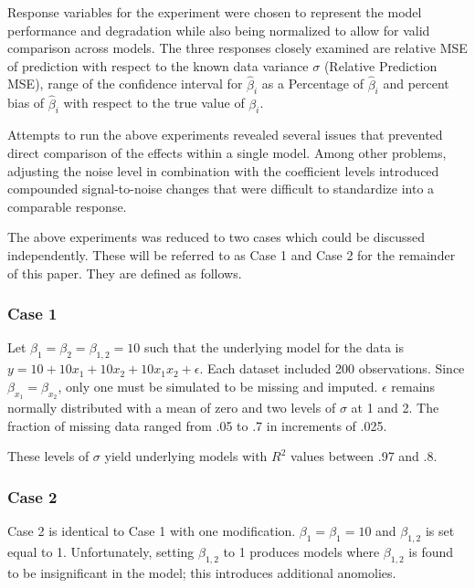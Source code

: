 \documentclass[../../paper.tex]{subfiles}
\begin{document}
Response variables for the experiment were chosen to represent the model performance
and degradation while also being normalized to allow for valid comparison across
models. The three responses closely examined are relative MSE of prediction
with respect to the known data variance $\sigma$ (Relative Prediction MSE), range of the confidence interval for $\hat{\beta}_{i}$ as a Percentage of $\hat{\beta}_{i}$
and percent bias of $\hat{\beta}_{i}$ with respect to the true value of $\beta_{i}$.

Attempts to run the above experiments revealed several issues that prevented direct comparison of the effects within a single model. Among other problems, adjusting the noise level in combination with the coefficient levels introduced compounded signal-to-noise changes that were difficult to standardize into a comparable response.

The above experiments was reduced to two cases which could be discussed independently.
These will be referred to as Case 1 and Case 2 for the remainder of this paper.
They are defined as follows.

\subsubsection{Case 1}
Let $\beta_{ 1} = \beta_{2} = \beta_{1,2} = 10$ such that the underlying model for the data is $y = 10 + 10x_{1} + 10x_{2} + 10x_{1}x_{2} + \epsilon $.
Each dataset included 200 observations.
Since $\beta_{ x_{1}} = \beta_{ x_{2}}$, only one must be simulated to be missing and imputed.
$\epsilon $ remains normally distributed with a mean of zero and two levels of $\sigma$ at 1 and 2. The fraction of missing data ranged from .05 to .7 in increments of .025.

These levels of $\sigma$ yield underlying models with $R^2$ values between .97 and .8.

\subsubsection{Case 2}

Case 2 is identical to Case 1 with one modification. $\beta_{1} = \beta_{1} = 10$ and $\beta_{1,2}$ is set equal to 1. Unfortunately, setting $\beta_{1,2}$ to 1 produces models where $\beta_{1,2}$ is found to be insignificant in the model; this introduces additional anomolies.


\end{document}

